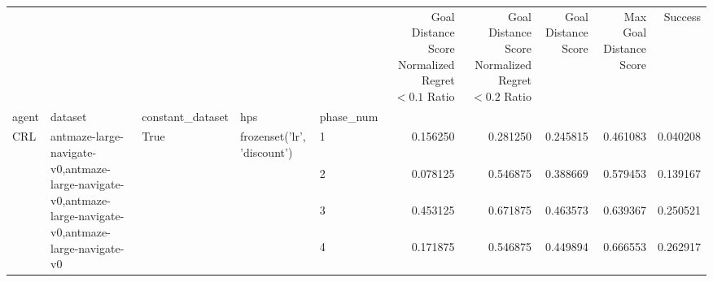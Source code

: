 \begin{tabular}{lllllrrrrr}
\toprule
 &  &  &  &  & Goal Distance Score Normalized Regret $< 0.1$ Ratio & Goal Distance Score Normalized Regret $< 0.2$ Ratio & Goal Distance Score & Max Goal Distance Score & Success \\
agent & dataset & constant_dataset & hps & phase_num &  &  &  &  &  \\
\midrule
\multirow[t]{4}{*}{CRL} & \multirow[t]{4}{*}{antmaze-large-navigate-v0,antmaze-large-navigate-v0,antmaze-large-navigate-v0,antmaze-large-navigate-v0} & \multirow[t]{4}{*}{True} & \multirow[t]{4}{*}{frozenset({'lr', 'discount'})} & 1 & 0.156250 & 0.281250 & 0.245815 & 0.461083 & 0.040208 \\
 &  &  &  & 2 & 0.078125 & 0.546875 & 0.388669 & 0.579453 & 0.139167 \\
 &  &  &  & 3 & 0.453125 & 0.671875 & 0.463573 & 0.639367 & 0.250521 \\
 &  &  &  & 4 & 0.171875 & 0.546875 & 0.449894 & 0.666553 & 0.262917 \\
\cline{1-10} \cline{2-10} \cline{3-10} \cline{4-10}
\bottomrule
\end{tabular}

